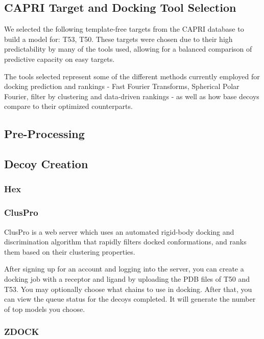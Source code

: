 \documentclass{article}
\begin{document}
\subsection{CAPRI Target and Docking Tool Selection}

We selected the following template-free targets from the CAPRI database to build a model for: T53, T50. These targets were chosen due to their high predictability by many of the tools used, allowing for a balanced comparison of predictive capacity on easy targets.

The tools selected represent some of the different methods currently employed for docking prediction and rankings - Fast Fourier Transforms, Spherical Polar Fourier, filter by clustering and data-driven rankings - as well as how base decoys compare to their optimized counterparts. 

\subsection{Pre-Processing}



\subsection{Decoy Creation}



\subsubsection{Hex}



\subsubsection{ClusPro}

ClusPro is a web server which uses an automated rigid-body docking and discrimination algorithm that rapidly filters docked conformations, and ranks them based on their clustering properties. 

After signing up for an account and logging into the server, you can create a docking job with a receptor and ligand by uploading the PDB files of T50 and T53. You may optionally choose what chains to use in docking. After that, you can view the queue status for the decoys completed. It will generate the number of top models you choose.

\subsubsection{ZDOCK}
\end{document}
